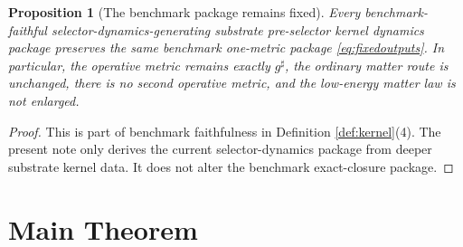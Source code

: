 \documentclass[11pt]{article}
\newcommand{\CompletedMetric}{g^{\sharp}}
\newtheorem{proposition}{Proposition}
\begin{document}
\begin{proposition}[The benchmark package remains fixed]
\label{prop:benchmark}
Every benchmark-faithful selector-dynamics-generating substrate pre-selector kernel dynamics package preserves the same benchmark one-metric package \eqref{eq:fixedoutputs}. In particular, the operative metric remains exactly \(\CompletedMetric\), the ordinary matter route is unchanged, there is no second operative metric, and the low-energy matter law is not enlarged.
\end{proposition}

\begin{proof}
This is part of benchmark faithfulness in Definition \ref{def:kernel}(4). The present note only derives the current selector-dynamics package from deeper substrate kernel data. It does not alter the benchmark exact-closure package.
\end{proof}

\section{Main Theorem}
\end{document}
